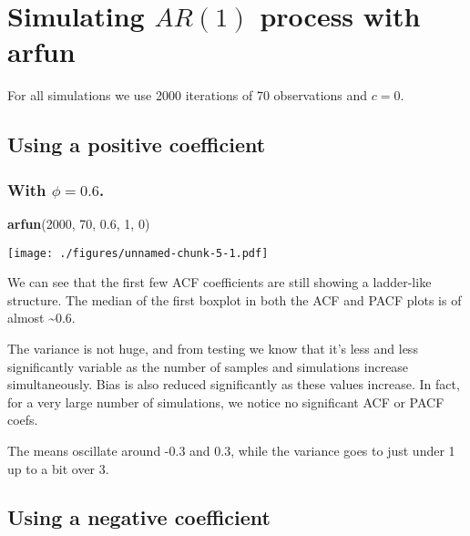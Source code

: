 \documentclass[]{article}
\newenvironment{Shaded}{\begin{snugshade}}{\end{snugshade}}
\newcommand{\DecValTok}[1]{\textcolor[rgb]{0.00,0.00,0.81}{#1}}
\newcommand{\FloatTok}[1]{\textcolor[rgb]{0.00,0.00,0.81}{#1}}
\newcommand{\KeywordTok}[1]{\textcolor[rgb]{0.13,0.29,0.53}{\textbf{#1}}}
\newcommand{\NormalTok}[1]{#1}
\begin{document}
\normalsize

\hypertarget{simulating-ar1-process-with-arfun}{%
\section{\texorpdfstring{Simulating \(AR(1)\) process with
\textbf{arfun}}{Simulating AR(1) process with arfun}}\label{simulating-ar1-process-with-arfun}}

For all simulations we use 2000 iterations of 70 observations and
\(c = 0\).

\hypertarget{using-a-positive-coefficient}{%
\subsection{Using a positive
coefficient}\label{using-a-positive-coefficient}}

\hypertarget{with-phi-0.6.}{%
\subsubsection{\texorpdfstring{With
\(\phi = 0.6\).}{With \textbackslash{}phi = 0.6.}}\label{with-phi-0.6.}}

\begin{Shaded}
\begin{Highlighting}[]
\KeywordTok{arfun}\NormalTok{(}\DecValTok{2000}\NormalTok{, }\DecValTok{70}\NormalTok{, }\FloatTok{0.6}\NormalTok{, }\DecValTok{1}\NormalTok{, }\DecValTok{0}\NormalTok{)}
\end{Highlighting}
\end{Shaded}

\texttt{[image: ./figures/unnamed-chunk-5-1.pdf]}

We can see that the first few ACF coefficients are still showing a
ladder-like structure. The median of the first boxplot in both the ACF
and PACF plots is of almost \textasciitilde{}0.6.

The variance is not huge, and from testing we know that it's less and
less significantly variable as the number of samples and simulations
increase simultaneously. Bias is also reduced significantly as these
values increase. In fact, for a very large number of simulations, we
notice no significant ACF or PACF coefs.

The means oscillate around -0.3 and 0.3, while the variance goes to just
under 1 up to a bit over 3.

\hypertarget{using-a-negative-coefficient}{%
\subsection{Using a negative
coefficient}\label{using-a-negative-coefficient}}
\end{document}
